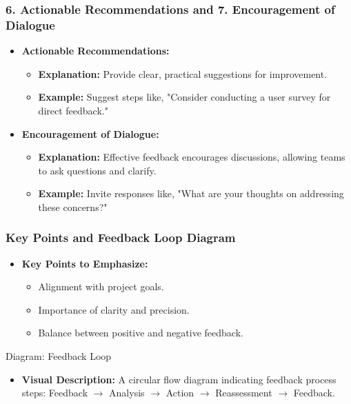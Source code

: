 \documentclass[aspectratio=169]{beamer}
\begin{document}
\begin{frame}[fragile]
    \frametitle{6. Actionable Recommendations and 7. Encouragement of Dialogue}
    \begin{itemize}
        \item \textbf{Actionable Recommendations:}
        \begin{itemize}
            \item \textbf{Explanation:} Provide clear, practical suggestions for improvement.
            \item \textbf{Example:} Suggest steps like, "Consider conducting a user survey for direct feedback."
        \end{itemize}
        \vspace{0.5em}
        
        \item \textbf{Encouragement of Dialogue:}
        \begin{itemize}
            \item \textbf{Explanation:} Effective feedback encourages discussions, allowing teams to ask questions and clarify.
            \item \textbf{Example:} Invite responses like, "What are your thoughts on addressing these concerns?"
        \end{itemize}
    \end{itemize}
\end{frame}

\begin{frame}[fragile]
    \frametitle{Key Points and Feedback Loop Diagram}
    \begin{itemize}
        \item \textbf{Key Points to Emphasize:}
        \begin{itemize}
            \item Alignment with project goals.
            \item Importance of clarity and precision.
            \item Balance between positive and negative feedback.
        \end{itemize}
    \end{itemize}
    
    \begin{block}{Diagram: Feedback Loop}
        \begin{itemize}
            \item \textbf{Visual Description:} A circular flow diagram indicating feedback process steps: 
            Feedback $\to$ Analysis $\to$ Action $\to$ Reassessment $\to$ Feedback.
        \end{itemize}
    \end{block}
\end{frame}
\end{document}
